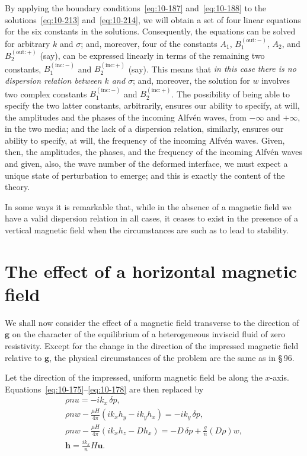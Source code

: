 By applying the boundary conditions~\eqref{eq:10-187} and~\eqref{eq:10-188} to the solutions~\eqref{eq:10-213} and~\eqref{eq:10-214}, we will obtain a set of four linear equations for the six constants in the solutions. Consequently, the equations can be solved for arbitrary $k$ and $\sigma$; and, moreover, four of the constants $A_1$, $B_1^{(\mathrm{out}:-)}$, $A_2$, and $B_2^{(\mathrm{out}:+)}$ (say), can be expressed linearly in terms of the remaining two constants, $B_1^{(\mathrm{inc}:-)}$ and $B_2^{(\mathrm{inc}:+)}$ (say). This means that \emph{in this case there is no dispersion relation between $k$ and $\sigma$}; and, moreover, the solution for $w$ involves two complex constants $B_1^{(\mathrm{inc}:-)}$ and $B_2^{(\mathrm{inc}:+)}$. The possibility of being able to specify the two latter constants, arbitrarily, ensures our ability to specify, at will, the amplitudes and the phases of the incoming Alfv\'en waves, from $-\infty$ and $+\infty$, in the two media; and the lack of a dispersion relation, similarly, ensures our ability to specify, at will, the frequency of the incoming Alfv\'en waves. Given, then, the amplitudes, the phases, and the frequency of the incoming Alfv\'en waves and given, also, the wave number of the deformed interface, we must expect a unique state of perturbation to emerge; and this is exactly the content of the theory.

In some ways it is remarkable that, while in the absence of a magnetic field we have a valid dispersion relation in all cases, it ceases to exist in the presence of a vertical magnetic field when the circumstances are such as to lead to stability.

\section{The effect of a horizontal magnetic field}\label{sec:97}

We shall now consider the effect of a magnetic field transverse to the direction of $\mathbf{g}$ on the character of the equilibrium of a heterogeneous inviscid fluid of zero resistivity. Except for the change in the direction of the impressed magnetic field relative to $\mathbf{g}$, the physical circumstances of the problem are the same as in \S\,96.

Let the direction of the impressed, uniform magnetic field be along the $x$-axis. Equations~\eqref{eq:10-175}--\eqref{eq:10-178} are then replaced by
\begin{gather}
\rho nu = -ik_x\,\delta p, \label{eq:10-215}\\
\rho nw - \frac{\mu H}{4\pi}(ik_xh_y-ik_yh_x) = -ik_y\,\delta p, \label{eq:10-216}\\
\rho nw - \frac{\mu H}{4\pi}(ik_xh_z-Dh_x) = -D\,\delta p+\frac{g}{n}(D\rho)w, \label{eq:10-217}\\
\mathbf{h} = \frac{ik_x}{n}H\mathbf{u}. \label{eq:10-218}
\end{gather}

